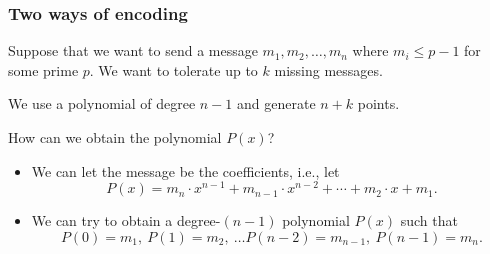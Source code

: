 \begin{frame}
  \frametitle{Two ways of encoding}

  Suppose that we want to send a message $m_1,m_2,\ldots,m_n$ where
  $m_i\leq p-1$ for some prime $p$.  We want to tolerate up to $k$
  missing messages.

  We use a polynomial of degree \pause $n-1$ and generate $n+k$ points.

  How can we obtain the polynomial $P(x)$?

  \begin{itemize}
  \item We can let the message be the coefficients, i.e., let
    \[
    P(x) = m_n\cdot x^{n-1} + m_{n-1}\cdot x^{n-2} + \cdots + m_2\cdot x + m_1.
    \]
    \pause
  \item We can try to obtain a degree-$(n-1)$ polynomial $P(x)$ such that
    \[
    P(0)=m_1, \
    P(1)=m_2, \ \ldots 
    P(n-2)=m_{n-1}, \ 
    P(n-1)=m_{n}.
    \]
  \end{itemize}
\end{frame}
